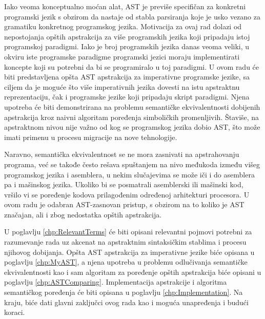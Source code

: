 Iako veoma konceptualno moćan alat, AST je previše specifičan za konkretni programski jezik s obzirom da nastaje od stabla parsiranja koje je usko vezano za gramatiku konkretnog programskog jezika. Motivacija za ovaj rad dolazi od nepostojanja opštih apstrakcija za više programskih jezika koji pripadaju istoj programskoj paradigmi. Iako je broj programskih jezika danas veoma veliki, u okviru iste programske paradigme programski jezici moraju implementirati koncepte koji su potrebni da bi se programiralo u toj paradigmi. U ovom radu će biti predstavljena opšta AST apstrakcija za imperativne programske jezike, sa ciljem da je moguće što više imperativnih jezika dovesti na istu apstraktnu reprezentaciju, čak i programske jezike koji pripadaju skript paradigmi. Njena upotreba će biti demonstrirana na problemu semantičke ekvivalentnosti dobijenih apstrakcija kroz naivni algoritam poređenja simboličkih promenljivih. Štaviše, na apstraktnom nivou nije važno od kog se programskog jezika dobio AST, što može imati primenu u procesu migracije na nove tehnologije.

Naravno, semantička ekvivalentnost se ne mora zasnivati na apstrahovanju programa, već se takođe često rešava spuštanjem na nivo međukoda između višeg programskog jezika i asemblera, u nekim slučajevima se može iči i do asemblera pa i mašinskog jezika. Ukoliko bi se posmatrali asemblerski ili mašinski kod, vršilo vi se poređenje kodova prilagođenim određenoj arhitekturi procesora. U ovom radu je odabran AST-zasnovan pristup, s obzirom na to koliko je AST značajan, ali i zbog nedostatka opštih apstrakcija.

U poglavlju \ref{chp:RelevantTerms} će biti opisani relevantni pojmovi potrebni za razumevanje rada uz akcenat na apstraktnim sintaksičkim stablima i procesu njihovog dobijanja. Opšta AST apstrakcija za imperativne jezike biće opisana u poglavlju \ref{chp:MyAST}, a njena upotreba u problemu odlučivanja semantičke ekvivalentnosti kao i sam algoritam za poređenje opštih apstrakcija biće opisani u poglavlju \ref{chp:ASTComparing}. Implementacija apstrakcije i algoritma semantičkog poređenja će biti opisana u poglavlju \ref{chp:Implementation}. Na kraju, biće dati glavni zaključci ovog rada kao i moguća unapređenja i budući koraci. 

